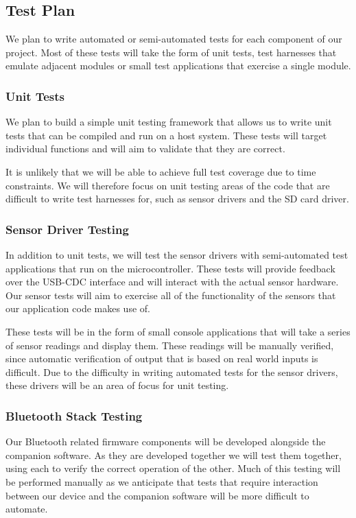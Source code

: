 \subsection{Test Plan}

We plan to write automated or semi-automated tests for each component of our
project. Most of these tests will take the form of unit tests, test harnesses
that emulate adjacent modules or small test applications that exercise a single
module.

\subsubsection{Unit Tests}

We plan to build a simple unit testing framework that allows us to write unit
tests that can be compiled and run on a host system. These tests will target
individual functions and will aim to validate that they are correct.

It is unlikely that we will be able to achieve full test coverage due to time
constraints. We will therefore focus on unit testing areas of the code that
are difficult to write test harnesses for, such as sensor drivers and the SD
card driver.

\subsubsection{Sensor Driver Testing}

In addition to unit tests, we will test the sensor drivers with semi-automated
test applications that run on the microcontroller. These tests will provide
feedback over the USB-CDC interface and will interact with the actual sensor
hardware.  Our sensor tests will aim to exercise all of the functionality of the
sensors that our application code makes use of.

These tests will be in the form of small console applications that will take
a series of sensor readings and display them. These readings will be manually
verified, since automatic verification of output that is based on real world
inputs is difficult. Due to the difficulty in writing automated tests for the
sensor drivers, these drivers will be an area of focus for unit testing.

\subsubsection{Bluetooth Stack Testing}

Our Bluetooth related firmware components will be developed alongside the
companion software. As they are developed together we will test them together,
using each to verify the correct operation of the other. Much of this testing
will be performed manually as we anticipate that tests that require interaction
between our device and the companion software will be more difficult to
automate.


